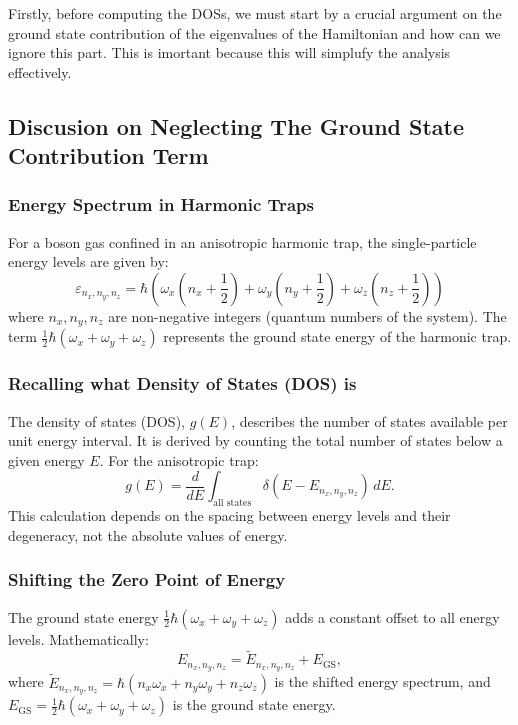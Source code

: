 \documentclass{article}
\numberwithin{equation}{section}
\numberwithin{equation}{subsection}
\begin{document}
Firstly, before computing the DOSs, we must start by a crucial argument on the ground state contribution of the eigenvalues of the Hamiltonian and how can we ignore this part. This is imortant because this will simplufy the analysis effectively.
\subsection{Discusion on Neglecting The Ground State Contribution Term}
\subsubsection{Energy Spectrum in Harmonic Traps}
For a boson gas confined in an anisotropic harmonic trap, the single-particle energy levels are given by:
\[
    \varepsilon_{\mathit{n}_{\mathit{x}},\mathit{n}_{\mathit{y}},\mathit{n}_{\mathit{z}}} = \hbar\left(\omega_{\mathit{x}}\left(\mathit{n}_{\mathit{x}}+\frac{1}{2}\right)+\omega_{\mathit{y}}\left(\mathit{n}_{\mathit{y}}+\frac{1}{2}\right)+\omega_{\mathit{z}}\left(\mathit{n}_{\mathit{z}}+\frac{1}{2}\right)\right)
\]
where \( \mathit{n}_{\mathit{x}},\mathit{n}_{\mathit{y}},\mathit{n}_{\mathit{z}} \) are non-negative integers (quantum numbers of the system). The term \( \frac{1}{2} \hbar (\omega_{\mathit{x}} + \omega_{\mathit{y}} + \omega_{\mathit{z}}) \) represents the ground state energy of the harmonic trap.

\subsubsection{Recalling what Density of States (DOS) is}
The density of states (DOS), \( g(E) \), describes the number of states available per unit energy interval. It is derived by counting the total number of states below a given energy \( E \). For the anisotropic trap:
\[
g(E) = \frac{d}{dE} \int_{\text{all states}} \delta(E - E_{\mathit{n}_{\mathit{x}},\mathit{n}_{\mathit{y}},\mathit{n}_{\mathit{z}}}) \, dE.
\]
This calculation depends on the spacing between energy levels and their degeneracy, not the absolute values of energy.

\subsubsection{Shifting the Zero Point of Energy}
The ground state energy \( \frac{1}{2} \hbar (\omega_{\mathit{x}} + \omega_{\mathit{y}} + \omega_{\mathit{z}}) \) adds a constant offset to all energy levels. Mathematically:
\[
E_{\mathit{n}_{\mathit{x}},\mathit{n}_{\mathit{y}},\mathit{n}_{\mathit{z}}} = \tilde{E}_{\mathit{n}_{\mathit{x}},\mathit{n}_{\mathit{y}},\mathit{n}_{\mathit{z}}} + E_{\text{GS}},
\]
where \( \tilde{E}_{\mathit{n}_{\mathit{x}},\mathit{n}_{\mathit{y}},\mathit{n}_{\mathit{z}}} = \hbar (\mathit{n}_{\mathit{x}} \omega_{\mathit{x}} + \mathit{n}_{\mathit{y}} \omega_{\mathit{y}} + \mathit{n}_{\mathit{z}} \omega_{\mathit{z}}) \) is the shifted energy spectrum, and \( E_{\text{GS}} = \frac{1}{2} \hbar (\omega_{\mathit{x}} + \omega_{\mathit{y}} + \omega_{\mathit{z}}) \) is the ground state energy.\\
\end{document}
